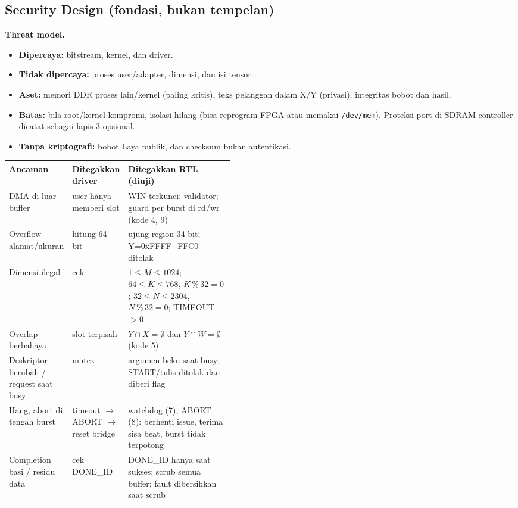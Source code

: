 \documentclass[9pt]{extarticle}
\newcommand{\hd}[1]{\cellcolor{thbg}\textbf{#1}}
\newcommand{\code}[1]{\colorbox{bg2}{\footnotesize\texttt{#1}}}
\begin{document}
\subsection{Security Design (fondasi, bukan tempelan)}
{\scriptsize
\textbf{Threat model.}
\begin{itemize}
\item \textbf{Dipercaya:} bitstream, kernel, dan driver.
\item \textbf{Tidak dipercaya:} proses user/adapter, dimensi, dan isi tensor.
\item \textbf{Aset:} memori DDR proses lain/kernel (paling kritis), teks pelanggan dalam X/Y (privasi), integritas bobot dan hasil.
\item \textbf{Batas:} bila root/kernel kompromi, isolasi hilang (bisa reprogram FPGA atau memakai \code{/dev/mem}). Proteksi port di SDRAM controller dicatat sebagai lapis-3 opsional.
\item \textbf{Tanpa kriptografi:} bobot Laya publik, dan checksum bukan autentikasi.
\end{itemize}

\begin{tabularx}{\linewidth}{|p{0.22\linewidth}|p{0.22\linewidth}|L|}
\hline
\hd{Ancaman} & \hd{Ditegakkan driver} & \hd{Ditegakkan RTL (diuji)} \\ \hline
DMA di luar buffer & user hanya memberi slot & WIN terkunci; validator; guard per burst di rd/wr (kode 4, 9) \\ \hline
Overflow alamat/ukuran & hitung 64-bit & ujung region 34-bit; Y=0xFFFF\_FFC0 ditolak \\ \hline
Dimensi ilegal & cek & $1\le M\le 1024$; $64\le K\le 768$, $K\,\%\,32=0$; $32\le N\le 2304$, $N\,\%\,32=0$; TIMEOUT$>0$ \\ \hline
Overlap berbahaya & slot terpisah & $Y\cap X = \emptyset$ dan $Y\cap W = \emptyset$ (kode 5) \\ \hline
Deskriptor berubah / request saat busy & mutex & argumen beku saat busy; START/tulis ditolak dan diberi flag \\ \hline
Hang, abort di tengah burst & timeout $\rightarrow$ ABORT $\rightarrow$ reset bridge & watchdog (7), ABORT (8): berhenti issue, terima sisa beat, burst tidak terpotong \\ \hline
Completion basi / residu data & cek DONE\_ID & DONE\_ID hanya saat sukses; scrub semua buffer; fault dibersihkan saat scrub \\ \hline
\end{tabularx}}
\end{document}
